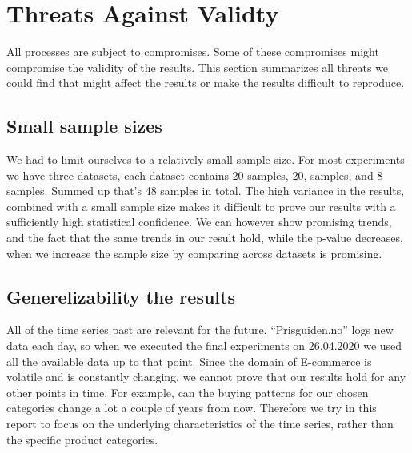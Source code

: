 \section{Threats Against Validty}
\label{section:Discussion:Threats}
All processes are subject to compromises. Some of these compromises might compromise the validity of
the results. This section summarizes all threats we could find that might affect the results or make
the results difficult to reproduce.

\subsection{Small sample sizes}
We had to limit ourselves to a relatively small sample size. For most experiments we have
three datasets, each dataset contains 20 samples, 20, samples, and 8 samples.
Summed up that's 48 samples in total. The high variance in the results, combined with a small sample size
makes it difficult to prove our results with a sufficiently high statistical confidence.
We can however show promising trends, and the fact that the same trends in our result hold, while
the p-value decreases, when
we increase the sample size by comparing across datasets is promising.




\subsection{Generelizability the results}
All of the time series past are relevant for the future. ``Prisguiden.no'' logs new data each day,
so when we executed the final experiments on 26.04.2020 we used all the available data up to that point.
Since the domain of E-commerce is volatile and is constantly changing, we cannot prove that our
results hold for any other points in time. For example, can the buying patterns for our chosen categories
change a lot a couple of years from now.
Therefore we try in this report to focus on the underlying characteristics of the time series, rather than
the specific product categories.


